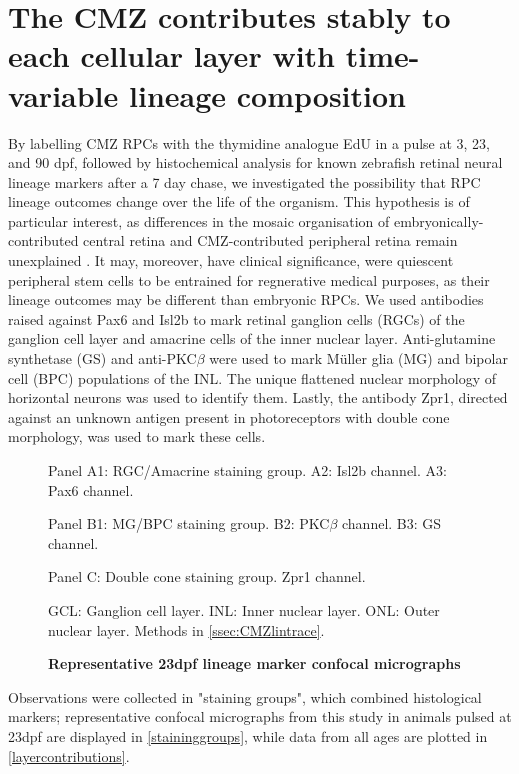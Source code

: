 \section{The CMZ contributes stably to each cellular layer with time-variable lineage composition}

By labelling CMZ RPCs with the thymidine analogue EdU in a pulse at 3, 23, and 90 dpf, followed by histochemical analysis for known zebrafish retinal neural lineage markers after a 7 day chase, we investigated the possibility that RPC lineage outcomes change over the life of the organism. This hypothesis is of particular interest, as differences in the mosaic organisation of embryonically-contributed central retina and CMZ-contributed peripheral retina remain unexplained \cite{Allison2010}. It may, moreover, have clinical significance, were quiescent peripheral stem cells to be entrained for regnerative medical purposes, as their lineage outcomes may be different than embryonic RPCs.  We used antibodies raised against Pax6 and Isl2b to mark retinal ganglion cells (RGCs) of the ganglion cell layer and amacrine cells of the inner nuclear layer. Anti-glutamine synthetase (GS) and anti-PKC$\beta$ were used to mark M\"{u}ller glia (MG) and bipolar cell (BPC) populations of the INL. The unique flattened nuclear morphology of horizontal neurons was used to identify them. Lastly, the antibody Zpr1, directed against an unknown antigen present in photoreceptors with double cone morphology, was used to mark these cells.

\begin{figure}[!h]
    \caption{{\bf Representative 23dpf lineage marker confocal micrographs}}
    Panel A1: RGC/Amacrine staining group. A2: Isl2b channel. A3: Pax6 channel.

    Panel B1: MG/BPC staining group. B2: PKC$\beta$ channel. B3: GS channel.

    Panel C: Double cone staining group. Zpr1 channel.

    GCL: Ganglion cell layer. INL: Inner nuclear layer. ONL: Outer nuclear layer.
    Methods in \autoref{ssec:CMZlintrace}.
    \label{staininggroups}
\end{figure}

Observations were collected in "staining groups", which combined histological markers; representative confocal micrographs from this study in animals pulsed at 23dpf are displayed in \autoref{staininggroups}, while data from all ages are plotted in \autoref{layercontributions}.

